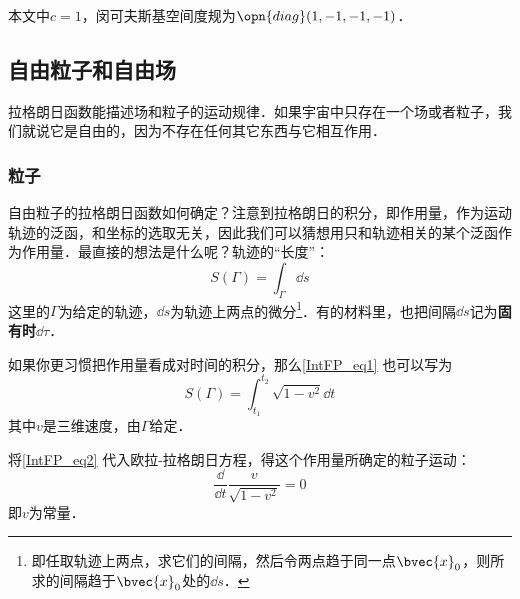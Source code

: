 

本文中$c=1$，闵可夫斯基空间度规为$\opn{diag}(1, -1, -1, -1)$．

\subsection{自由粒子和自由场}

拉格朗日函数能描述场和粒子的运动规律．如果宇宙中只存在一个场或者粒子，我们就说它是自由的，因为不存在任何其它东西与它相互作用．

\subsubsection{粒子}

自由粒子的拉格朗日函数如何确定？注意到拉格朗日的积分，即作用量，作为运动轨迹的泛函，和坐标的选取无关，因此我们可以猜想用只和轨迹相关的某个泛函作为作用量．最直接的想法是什么呢？轨迹的“长度”：
\begin{equation}\label{IntFP_eq1}
S(\Gamma) = \int_\Gamma \dd s
\end{equation}
这里的$\Gamma$为给定的轨迹，$\dd s$为轨迹上两点的微分\footnote{即任取轨迹上两点，求它们的间隔，然后令两点趋于同一点$\bvec{x}_0$，则所求的间隔趋于$\bvec{x}_0$处的$\dd s$．}．有的材料里，也把间隔$\dd s$记为\textbf{固有时}$\dd \tau$．

如果你更习惯把作用量看成对时间的积分，那么\autoref{IntFP_eq1} 也可以写为
\begin{equation}\label{IntFP_eq2}
S(\Gamma) = \int_{t_1}^{t_2} \sqrt{1-v^2} \dd t
\end{equation}
其中$v$是三维速度，由$\Gamma$给定．

将\autoref{IntFP_eq2} 代入欧拉-拉格朗日方程，得这个作用量所确定的粒子运动：
\begin{equation}
\frac{\dd}{\dd t}\frac{v}{\sqrt{1-v^2}} = 0
\end{equation}
即$v$为常量．


















